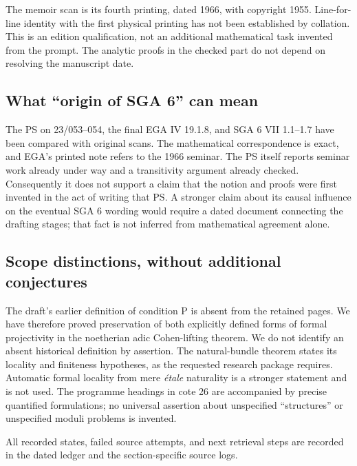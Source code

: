 The memoir scan is its fourth printing, dated 1966, with copyright
1955. Line-for-line identity with the first physical printing has
not been established by collation. This is an edition qualification,
not an additional mathematical task invented from the prompt.
The analytic proofs in the checked part do not depend on resolving
the manuscript date.

\subsection{What ``origin of SGA 6'' can mean}

The PS on 23/053--054, the final EGA IV 19.1.8, and SGA 6 VII
1.1--1.7 have been compared with original scans. The mathematical
correspondence is exact, and EGA's printed note refers to the 1966
seminar. The PS itself reports seminar work already under way and a
transitivity argument already checked. Consequently it does not
support a claim that the notion and proofs were first invented in
the act of writing that PS. A stronger claim about its causal
influence on the eventual SGA 6 wording would require a dated
document connecting the drafting stages; that fact is not inferred
from mathematical agreement alone.

\subsection{Scope distinctions, without additional conjectures}

The draft's earlier definition of condition P is absent from the retained
pages. We have therefore proved preservation of both explicitly defined
forms of formal projectivity in the noetherian adic Cohen-lifting theorem.
We do not identify an absent historical definition by assertion.
The natural-bundle theorem states its locality and finiteness hypotheses,
as the requested research package requires. Automatic formal locality
from mere \emph{\'etale} naturality is a stronger statement and is not
used. The programme headings in cote 26 are accompanied by precise
quantified formulations; no universal assertion about unspecified
``structures'' or unspecified moduli problems is invented.

All recorded states, failed source attempts, and next retrieval steps are
recorded in the dated ledger and the section-specific source logs.
